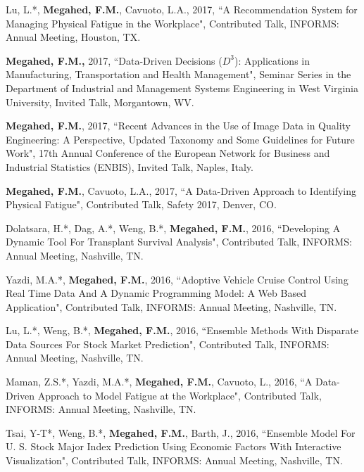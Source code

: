 \documentclass[margin,line]{res}
\begin{document}
\begin{resume}
\vspace{-1.5mm}
Lu, L.*, \textbf{Megahed, F.M.}, Cavuoto, L.A., 2017, ``A Recommendation System for Managing Physical Fatigue in the Workplace", Contributed Talk, INFORMS: Annual Meeting, Houston, TX.

\vspace{-1.5mm}
\textbf{Megahed, F.M.,} 2017, ``Data-Driven Decisions ($D^3$): Applications in Manufacturing, Transportation and Health Management", Seminar Series in the Department of Industrial and Management Systems Engineering in West Virginia University, Invited Talk, Morgantown, WV.

\vspace{-1.5mm}
\textbf{Megahed, F.M.}, 2017, ``Recent Advances in the Use of Image Data in Quality Engineering: A Perspective, Updated Taxonomy and Some Guidelines for Future Work", 17th Annual Conference of the European Network for Business and Industrial Statistics (ENBIS), Invited Talk, Naples, Italy. 


\vspace{-1.5mm}
\textbf{Megahed, F.M.}, Cavuoto, L.A., 2017, ``A Data-Driven Approach to Identifying Physical Fatigue", Contributed Talk, Safety 2017, Denver, CO.

\vspace{-1.5mm}
Dolatsara, H.*, Dag, A.*, Weng, B.*, \textbf{Megahed, F.M.}, 2016, ``Developing A Dynamic Tool For Transplant Survival Analysis", Contributed Talk, INFORMS: Annual Meeting, Nashville, TN.

\vspace{-1.5mm}
Yazdi, M.A.*, \textbf{Megahed, F.M.}, 2016, ``Adoptive Vehicle Cruise Control Using Real Time Data And A Dynamic Programming Model: A Web Based Application", Contributed Talk, INFORMS: Annual Meeting, Nashville, TN.

\vspace{-1.5mm}
Lu, L.*, Weng, B.*, \textbf{Megahed, F.M.}, 2016, ``Ensemble Methods With Disparate Data Sources For Stock Market Prediction", Contributed Talk, INFORMS: Annual Meeting, Nashville, TN.

\vspace{-1.5mm}
Maman, Z.S.*, Yazdi, M.A.*, \textbf{Megahed, F.M.}, Cavuoto, L., 2016, ``A Data-Driven Approach to Model Fatigue at the Workplace", Contributed Talk, INFORMS: Annual Meeting, Nashville, TN.

\vspace{-1.5mm}
Tsai, Y-T*, Weng, B.*, \textbf{Megahed, F.M.}, Barth, J., 2016, ``Ensemble Model For U. S. Stock Major Index Prediction Using Economic Factors With Interactive Visualization", Contributed Talk, INFORMS: Annual Meeting, Nashville, TN.


\end{resume}
\end{document}

